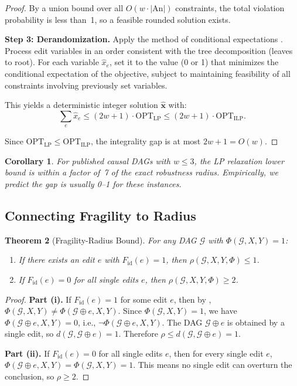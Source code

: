 \documentclass[11pt,a4paper]{article}
\newtheorem{theorem}{Theorem}[section]
\newtheorem{corollary}[theorem]{Corollary}
\theoremstyle{definition}
\theoremstyle{remark}
\newcommand{\DAG}{\mathcal{G}}
\newcommand{\An}{\mathrm{An}}
\newcommand{\editdist}{d}
\newcommand{\fragility}{F}
\newcommand{\radius}{\rho}
\newcommand{\Phi}{\varPhi}
\begin{document}
\begin{proof}
By a union bound over all $O(w \cdot |\An|)$ constraints, the total violation
probability is less than~1, so a feasible rounded solution exists.

\medskip
\noindent\textbf{Step 3: Derandomization.}
Apply the method of conditional expectations \cite{raghavan1988}. Process edit variables
in an order consistent with the tree decomposition (leaves to root). For each variable
$\hat{x}_e$, set it to the value (0 or 1) that minimizes the conditional expectation
of the objective, subject to maintaining feasibility of all constraints involving
previously set variables.

This yields a deterministic integer solution $\hat{\mathbf{x}}$ with:
\[
  \sum_e \hat{x}_e \leq (2w+1) \cdot \mathrm{OPT}_{\mathrm{LP}}
  \leq (2w+1) \cdot \mathrm{OPT}_{\mathrm{ILP}}.
\]

Since $\mathrm{OPT}_{\mathrm{LP}} \leq \mathrm{OPT}_{\mathrm{ILP}}$, the integrality
gap is at most $2w + 1 = O(w)$.
\end{proof}

\begin{corollary}\label{cor:gap_small_w}
For published causal DAGs with $w \leq 3$, the LP relaxation lower bound is within a
factor of~7 of the exact robustness radius. Empirically, we predict the gap is usually
0--1 for these instances.
\end{corollary}

\subsection{Connecting Fragility to Radius}

\begin{theorem}[Fragility-Radius Bound]\label{thm:fragility_radius}
For any DAG $\DAG$ with $\Phi(\DAG, X, Y) = 1$:
\begin{enumerate}[label=(\roman*)]
  \item If there exists an edit $e$ with $\fragility_{\mathrm{id}}(e) = 1$, then
    $\radius(\DAG, X, Y, \Phi) \leq 1$.
  \item If $\fragility_{\mathrm{id}}(e) = 0$ for all single edits $e$, then
    $\radius(\DAG, X, Y, \Phi) \geq 2$.
\end{enumerate}
\end{theorem}

\begin{proof}
\textbf{Part (i).} If $\fragility_{\mathrm{id}}(e) = 1$ for some edit $e$, then by
, $\Phi(\DAG, X, Y) \neq \Phi(\DAG \oplus e, X, Y)$. Since
$\Phi(\DAG, X, Y) = 1$, we have $\Phi(\DAG \oplus e, X, Y) = 0$, i.e.,
$\neg\Phi(\DAG \oplus e, X, Y)$. The DAG $\DAG \oplus e$ is obtained by a single edit,
so $\editdist(\DAG, \DAG \oplus e) = 1$. Therefore
$\radius \leq \editdist(\DAG, \DAG \oplus e) = 1$.

\textbf{Part (ii).} If $\fragility_{\mathrm{id}}(e) = 0$ for all single edits $e$,
then for every single edit $e$, $\Phi(\DAG \oplus e, X, Y) = \Phi(\DAG, X, Y) = 1$.
This means no single edit can overturn the conclusion, so $\radius \geq 2$.
\end{proof}
\end{document}
